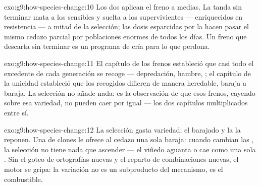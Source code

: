 \begin{solution}{exo:g9:how-species-change:10}
Los dos aplican el freno a medias. La tanda sin terminar mata a los
sensibles y suelta a los supervivientes --- enriquecidos en resistencia
--- a mitad de la selección; las dosis esparcidas por la 
hacen pasar el mismo cedazo parcial por poblaciones enormes de 
todos los días. Un freno que descarta sin terminar es un programa de
cría para lo que perdona.
\end{solution}

\begin{solution}{exo:g9:how-species-change:11}
El capítulo de los frenos estableció que casi todo el excedente de cada
generación se recoge --- depredación, hambre, ; el capítulo
de la unicidad estableció que los recogidos difieren de manera
heredable, baraja a baraja. La selección no añade nada: es la
observación de que esos frenos, cayendo sobre esa variedad, no pueden
caer por igual --- los dos capítulos multiplicados entre sí.
\end{solution}

\begin{solution}{exo:g9:how-species-change:12}
La selección gasta variedad; el barajado y la  la reponen. Una
 de clones le ofrece al cedazo una sola baraja: cuando cambian
las , la selección no tiene nada que ascender --- el viñedo
aguanta o cae como una sola . Sin el goteo de ortografías nuevas
y el reparto de combinaciones nuevas, el motor se gripa: la variación
no es un subproducto del mecanismo, es el combustible.
\end{solution}

